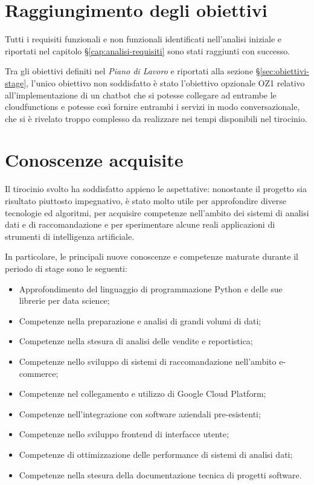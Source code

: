 \section{Raggiungimento degli obiettivi}

Tutti i requisiti funzionali e non funzionali identificati nell'analisi iniziale e riportati nel capitolo \S\ref{cap:analisi-requisiti} sono stati raggiunti con successo.

Tra gli obiettivi definiti nel \emph{Piano di Lavoro} e riportati alla sezione \S\ref{sec:obiettivi-stage}, l'unico obiettivo non soddisfatto è stato l'obiettivo opzionale OZ1 relativo all'implementazione di un chatbot che si potesse collegare ad entrambe le \gls{cloudfunctions} e potesse così fornire entrambi i servizi in modo conversazionale, che si è rivelato troppo complesso da realizzare nei tempi disponibili nel tirocinio.


\section{Conoscenze acquisite}

Il tirocinio svolto ha soddisfatto appieno le aspettative: nonostante il progetto sia risultato piuttosto impegnativo, è stato molto utile per approfondire diverse tecnologie ed algoritmi, per acquisire competenze nell’ambito dei sistemi di analisi dati e di raccomandazione e per sperimentare alcune reali applicazioni di strumenti di intelligenza artificiale.

In particolare, le principali nuove conoscenze e competenze maturate durante il
periodo di stage sono le seguenti:

\begin{itemize}
    \item Approfondimento del linguaggio di programmazione Python e delle sue librerie per data science;
    \item Competenze nella preparazione e analisi di grandi volumi di dati;
    \item Competenze nella stesura di analisi delle vendite e reportistica;
    \item Competenze nello sviluppo di sistemi di raccomandazione nell'ambito e-commerce;
    \item Competenze nel collegamento e utilizzo di Google Cloud Platform;
    \item Competenze nell'integrazione con software aziendali pre-esistenti;
    \item Competenze nello sviluppo frontend di interfacce utente;
    \item Competenze di ottimizzazione delle performance di sistemi di analisi dati;
    \item Competenze nella stesura della documentazione tecnica di progetti software.
\end{itemize}


